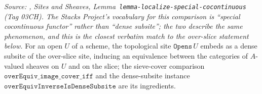 \begin{lemma}
  \label{lem:over_slice_sheaf_equiv}
  \textit{Source: \cite{stacks-project}, Sites and Sheaves,
  Lemma~\texttt{lemma-localize-special-cocontinuous} (Tag 03CH). The Stacks Project's
  vocabulary for this comparison is ``special cocontinuous functor'' rather than
  ``dense subsite''; the two describe the same phenomenon, and this is the closest
  verbatim match to the over-slice statement below.}
  For an open \(U\) of a scheme, the topological site \(\mathtt{Opens}\,U\) embeds as a
  dense subsite of the over-slice site, inducing an equivalence between the categories of
  \(A\)-valued sheaves on \(U\) and on the slice; the sieve-cover comparison
  \(\mathtt{overEquiv\_image\_cover\_iff}\) and the dense-subsite instance
  \(\mathtt{overEquivInverseIsDenseSubsite}\) are its ingredients.
\end{lemma}
